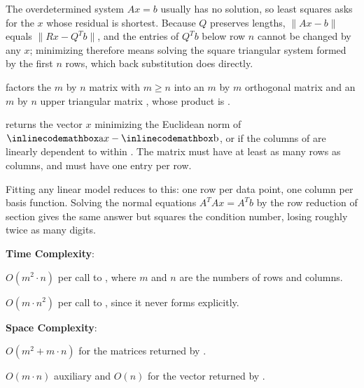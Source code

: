 The overdetermined system $Ax = b$ usually has no solution, so least squares asks for the $x$ whose residual is shortest. Because $Q$ preserves lengths, $\|Ax - b\|$ equals $\|Rx - Q^Tb\|$, and the entries of $Q^Tb$ below row $n$ cannot be changed by any $x$; minimizing therefore means solving the square triangular system formed by the first $n$ rows, which back substitution does directly.

\begin{compactitem}
  \item {} factors the $m$ by $n$ matrix  with $m \geq n$ into an $m$ by $m$ orthogonal matrix  and an $m$ by $n$ upper triangular matrix , whose product is .
  \item {} returns the vector $x$ minimizing the Euclidean norm of ${\inlinecodemath{a}}x - {\inlinecodemath{b}}$, or  if the columns of  are linearly dependent to within . The matrix  must have at least as many rows as columns, and  must have one entry per row.
\end{compactitem}

Fitting any linear model reduces to this: one row per data point, one column per basis function. Solving the normal equations $A^TAx = A^Tb$ by the row reduction of section  gives the same answer but squares the condition number, losing roughly twice as many digits.

\textbf{Time Complexity}:
\begin{compactitem}
  \item $O(m^{2} \cdot n)$ per call to , where $m$ and $n$ are the numbers of rows and columns.
  \item $O(m \cdot n^{2})$ per call to , since it never forms  explicitly.
\end{compactitem}

\textbf{Space Complexity}:
\begin{compactitem}
  \item $O(m^{2} + m \cdot n)$ for the matrices returned by .
  \item $O(m \cdot n)$ auxiliary and $O(n)$ for the vector returned by .
\end{compactitem}

